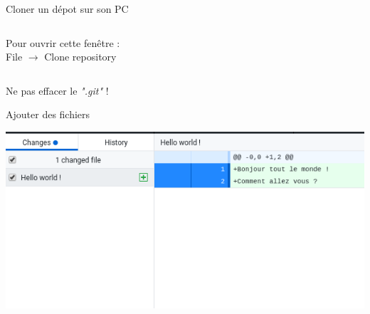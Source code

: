\documentclass{beamer}
\begin{document}
\begin{frame}{Cloner un dépot sur son PC}
\begin{columns}
\begin{column}{0.5\textwidth}
            {\small Pour ouvrir cette fenêtre : \\File $\rightarrow$ Clone repository}
        \end{column}
    \end{columns}
    \begin{center}
        Ne pas effacer le \emph{".git"} !
    \end{center}
\end{frame}

\begin{frame}{Ajouter des fichiers}
    \begin{center}
        \includegraphics[width=\textwidth]{img/github_desktop/see_added.png}
    \end{center}
\end{frame}
\end{document}
